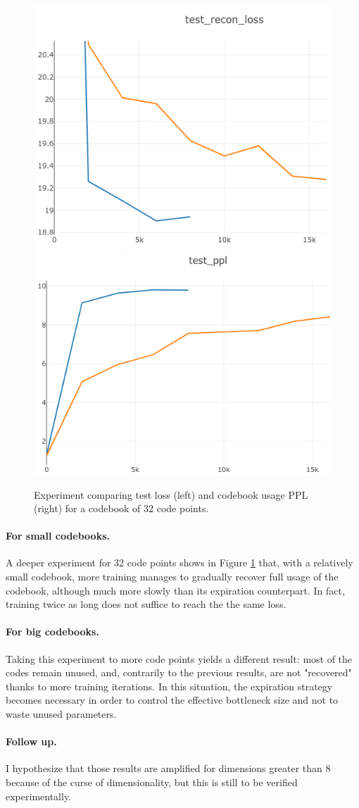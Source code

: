 \begin{figure}
    \centering
    \includegraphics[width=0.45\columnwidth]{60-files/loss-32.png}
    \includegraphics[width=0.45\columnwidth]{60-files/ppl-32.png}
    \caption{Experiment comparing test loss (left) and codebook usage PPL (right) for a codebook of 32 code points.}
    \label{fig:agingvq-32}
\end{figure}

\paragraph{For small codebooks.}
A deeper experiment for 32 code points shows in Figure \ref{fig:agingvq-32} that, with a relatively small codebook, more training manages to gradually recover full usage of the codebook, although much more slowly than its expiration counterpart. In fact, training twice as long does not suffice to reach the the same loss.

\paragraph{For big codebooks.}
Taking this experiment to more code points yields a different result: most of the codes remain unused, and, contrarily to the previous results, are not "recovered" thanks to more training iterations. In this situation, the expiration strategy becomes necessary in order to control the effective bottleneck size and not to waste unused parameters.

\paragraph{Follow up.}
I hypothesize that those results are amplified for dimensions greater than 8 because of the curse of dimensionality, but this is still to be verified experimentally.

